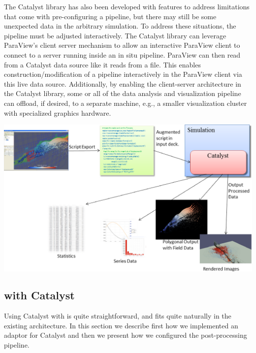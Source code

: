 The Catalyst library has also been developed with features to address limitations that come with pre-configuring a pipeline, but there may still be some unexpected data in the arbitrary simulation. To address these situations, the pipeline must be adjusted interactively.
The Catalyst library can leverage ParaView's client server mechanism to allow an
interactive ParaView client to connect to a server running inside an in situ
pipeline. ParaView can then read from a Catalyst data source like it reads from
a file. This enables construction/modification of a pipeline interactively in the ParaView client via this live data source. Additionally, by enabling the client-server architecture in the Catalyst library, some or all of the data analysis and visualization pipeline can offload, if desired, to a separate machine, e.g., a smaller visualization cluster with specialized graphics hardware.

\vspace{+0.25in}
\includegraphics[scale=0.47]{pictures/CatalystFullWorkFlow.eps}
\label{fig:catalyst}
\vspace{-0.14in}

\subsection{\CS with Catalyst}

Using Catalyst with \CS is quite straightforward, and fits
quite naturally in the existing architecture. In this section we describe first
how we implemented an adaptor for Catalyst and then we present how we configured the
post-processing pipeline.

